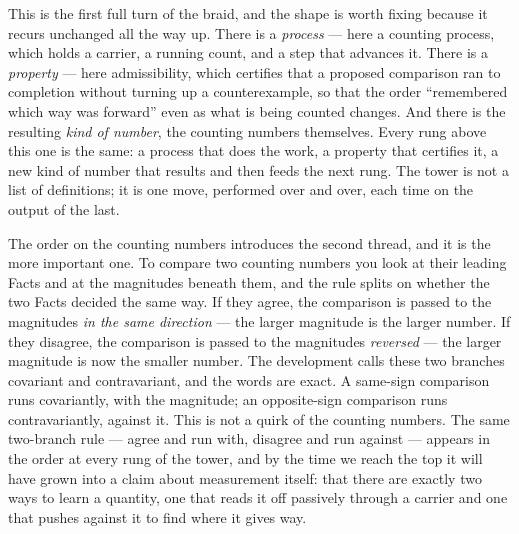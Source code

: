 This is the first full turn of the braid, and the shape is worth fixing because it recurs unchanged
all the way up. There is a \emph{process} --- here a counting process, which holds a carrier, a
running count, and a step that advances it. There is a \emph{property} --- here admissibility, which
certifies that a proposed comparison ran to completion without turning up a counterexample, so that
the order ``remembered which way was forward'' even as what is being counted changes. And there is the
resulting \emph{kind of number}, the counting numbers themselves. Every rung above this one is the
same: a process that does the work, a property that certifies it, a new kind of number that results
and then feeds the next rung. The tower is not a list of definitions; it is one move, performed over
and over, each time on the output of the last.

The order on the counting numbers introduces the second thread, and it is the more important one. To
compare two counting numbers you look at their leading Facts and at the magnitudes beneath them, and
the rule splits on whether the two Facts decided the same way. If they agree, the comparison is passed
to the magnitudes \emph{in the same direction} --- the larger magnitude is the larger number. If they
disagree, the comparison is passed to the magnitudes \emph{reversed} --- the larger magnitude is now
the smaller number. The development calls these two branches covariant and contravariant, and the
words are exact. A same-sign comparison runs covariantly, with the magnitude; an opposite-sign
comparison runs contravariantly, against it. This is not a quirk of the counting numbers. The same
two-branch rule --- agree and run with, disagree and run against --- appears in the order at every rung
of the tower, and by the time we reach the top it will have grown into a claim about measurement
itself: that there are exactly two ways to learn a quantity, one that reads it off passively through a
carrier and one that pushes against it to find where it gives way.

